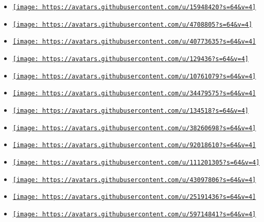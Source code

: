 \begin{itemize}
\item
  \href{https://github.com/barvirm}{\texttt{[image: https://avatars.githubusercontent.com/u/15948420?s=64\&v=4]}}
\item
  \href{https://github.com/dreamlax}{\texttt{[image: https://avatars.githubusercontent.com/u/4708805?s=64\&v=4]}}
\item
  \href{https://github.com/dvdvgt}{\texttt{[image: https://avatars.githubusercontent.com/u/40773635?s=64\&v=4]}}
\item
  \href{https://github.com/flxo}{\texttt{[image: https://avatars.githubusercontent.com/u/129436?s=64\&v=4]}}
\item
  \href{https://github.com/jakobrs}{\texttt{[image: https://avatars.githubusercontent.com/u/10761079?s=64\&v=4]}}
\item
  \href{https://github.com/jdm204}{\texttt{[image: https://avatars.githubusercontent.com/u/34479575?s=64\&v=4]}}
\item
  \href{https://github.com/kianmeng}{\texttt{[image: https://avatars.githubusercontent.com/u/134518?s=64\&v=4]}}
\item
  \href{https://github.com/liamsanft}{\texttt{[image: https://avatars.githubusercontent.com/u/38260698?s=64\&v=4]}}
\item
  \href{https://github.com/oskgo}{\texttt{[image: https://avatars.githubusercontent.com/u/92018610?s=64\&v=4]}}
\item
  \href{https://github.com/rpitasky}{\texttt{[image: https://avatars.githubusercontent.com/u/111201305?s=64\&v=4]}}
\item
  \href{https://github.com/thecaralice}{\texttt{[image: https://avatars.githubusercontent.com/u/43097806?s=64\&v=4]}}
\item
  \href{https://github.com/user202729}{\texttt{[image: https://avatars.githubusercontent.com/u/25191436?s=64\&v=4]}}
\item
  \href{https://github.com/vxpm}{\texttt{[image: https://avatars.githubusercontent.com/u/59714841?s=64\&v=4]}}
\end{itemize}

